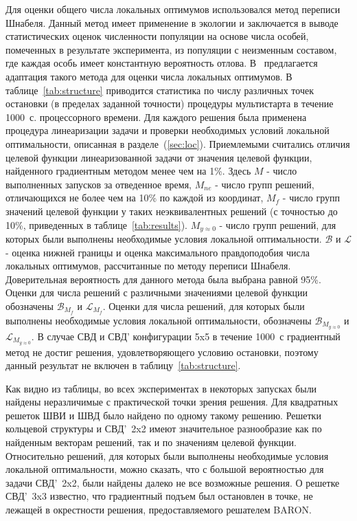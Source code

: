 Для оценки общего числа локальных оптимумов использовался метод переписи Шнабеля. Данный метод имеет применение в экологии и заключается в
выводе статистических оценок численности популяции на основе числа особей, помеченных в результате эксперимента, из популяции с неизменным
составом, где каждая особь имеет константную вероятность отлова. В~\cite{eremeev:confidence} предлагается адаптация такого метода для оценки числа локальных оптимумов. В таблице~\ref{tab:structure} приводится статистика по числу различных точек остановки (в пределах заданной точности) процедуры мультистарта в течение 1000~с. процессорного времени. Для каждого решения была применена процедура линеаризации задачи и проверки необходимых условий локальной оптимальности, описанная в разделе~(\ref{sec:loc}). Приемлемыми считались отличия целевой функции линеаризованной задачи от значения целевой функции, найденного градиентным методом менее чем на 1\%. Здесь {$M$} - число выполненных запусков за отведенное время, $M_{ne}$ - число групп решений, отличающихся не более чем на 10\% по каждой из координат, {$M_{f}$} - число групп значений целевой функции у таких неэквивалентных решений (с точностью до 10\%, приведенных в таблице~\ref{tab:results}). {$M_{y\approx0}$} - число групп решений, для которых были выполнены необходимые условия локальной оптимальности. $\mathcal{B}$ и $\mathcal{L}$ - оценка нижней границы и оценка максимального правдоподобия числа локальных оптимумов, рассчитанные по методу переписи Шнабеля. Доверительная вероятность для данного метода была выбрана равной 95\%. Оценки для числа решений с различными значениями целевой функции обозначены $\mathcal{B}_{M_f}$ и $\mathcal{L}_{M_f}$. Оценки для числа решений, для которых были выполнены необходимые условия локальной оптимальности, обозначены $\mathcal{B}_{M_{y\approx0}}$ и $\mathcal{L}_{M_{y\approx0}}$.
В случае СВД и СВД' конфигурации 5x5 в течение 1000~с градиентный метод не достиг решения, удовлетворяющего условию остановки, поэтому
данный результат не включен в таблицу~\ref{tab:structure}.

Как видно из таблицы, во всех экспериментах в некоторых запусках были найдены неразличимые с практической точки зрения решения. Для квадратных решеток ШВИ и ШВД было найдено по одному такому решению. Решетки кольцевой структуры и СВД'~2x2 имеют значительное разнообразие как по найденным векторам решений, так и по значениям целевой функции. Относительно решений, для которых были выполнены необходимые условия локальной оптимальности, можно сказать, что с большой вероятностью для задачи СВД'~2x2, были найдены далеко не все возможные решения. О решетке СВД'~3x3 известно, что градиентный подъем был остановлен в точке, не лежащей в окрестности решения, предоставляемого решателем BARON.

